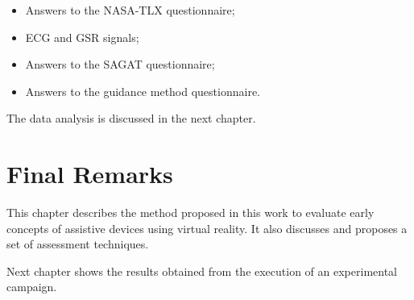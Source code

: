 \begin{itemize}
    \item Answers to the NASA-TLX questionnaire;
    \item ECG and GSR signals;
    \item Answers to the SAGAT questionnaire;
    \item Answers to the guidance method questionnaire.
\end{itemize}

The data analysis is discussed in the next chapter.

\section{Final Remarks}

This chapter describes the method proposed in this work to evaluate early concepts of assistive devices using virtual reality. It also discusses and proposes a set of assessment techniques. 

Next chapter shows the results obtained from the execution of an experimental campaign.